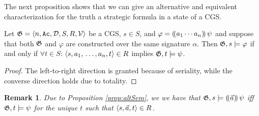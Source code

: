 \documentclass[sigconf,anonymous]{aamas}
\newtheorem{remark}{Remark}
\newcommand{\rem}[1]{{\color{red} #1}}
\begin{document}
  

    

The next proposition shows that we can give an alternative and equivalent characterization for the truth a strategic formula in a state of  a CGS. 

\begin{proposition}
\label{prop:altSem}
    Let $\mathfrak{G} = \langle n,\texttt{Ac}, \mathcal{D}, S,R, \mathcal{V}  \rangle$ be a CGS, $s \in S$, and $\varphi = (\!( {a_1}\cdots {a_n} )\!)\, \psi$ and suppose that both $\mathfrak{G}$ and $\varphi$ are constructed over the same signature $\alpha$. %
    Then $\mathfrak{G},s \models \varphi$ if and only if %
    $\forall t \in S$: $\langle s,a_1,\,\ldots, a_n,t \rangle\in R$ implies $\mathfrak{G},t\models \psi$. 
    
     \end{proposition}
   \begin{proof}
       The left-to-right direction is granted because of seriality, while the converse direction %
       holds due to totality. 
   \end{proof}

   \begin{remark}
      Due to Proposition \ref{prop:altSem}, we %
      we have that
      $\mathfrak{G},s\models (\!( \vec a )\!)\,\psi$ iff  $\mathfrak{G},t\models \psi$ for the unique $t$ such that $\langle s,\vec{a},t \rangle\in R$. 
   \end{remark}
   
\end{document}
